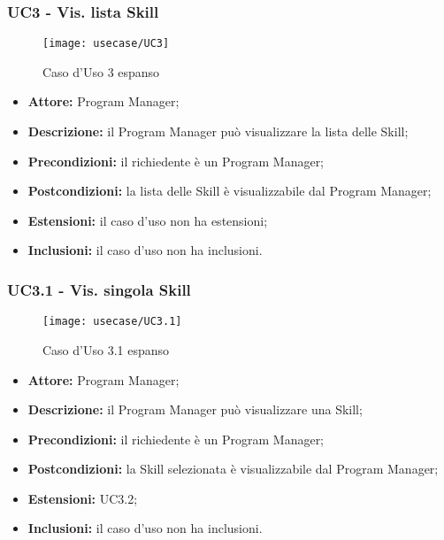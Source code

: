 \subsubsection*{UC3 - Vis. lista Skill}
\begin{figure}[H] 
    \centering 
    \texttt{[image: usecase/UC3]} 
    \caption{Caso d'Uso 3 espanso}
\end{figure}
\begin{itemize}[label=$\circ$]
\item \textbf{Attore:} Program Manager;
\item \textbf{Descrizione:} il Program Manager può visualizzare la lista delle Skill;
\item \textbf{Precondizioni:} il richiedente è un Program Manager;
\item \textbf{Postcondizioni:} la lista delle Skill è visualizzabile dal Program Manager;
\item \textbf{Estensioni:} il caso d'uso non ha estensioni;
\item \textbf{Inclusioni:} il caso d'uso non ha inclusioni.
\end{itemize}

\subsubsection*{UC3.1 - Vis. singola Skill}
\begin{figure}[H] 
    \centering 
    \texttt{[image: usecase/UC3.1]} 
    \caption{Caso d'Uso 3.1 espanso}
\end{figure}
\begin{itemize}[label=$\circ$]
\item \textbf{Attore:} Program Manager;
\item \textbf{Descrizione:} il Program Manager può visualizzare una Skill;
\item \textbf{Precondizioni:} il richiedente è un Program Manager;
\item \textbf{Postcondizioni:} la Skill selezionata è visualizzabile dal Program Manager;
\item \textbf{Estensioni:} UC3.2;
\item \textbf{Inclusioni:} il caso d'uso non ha inclusioni.
\end{itemize}

